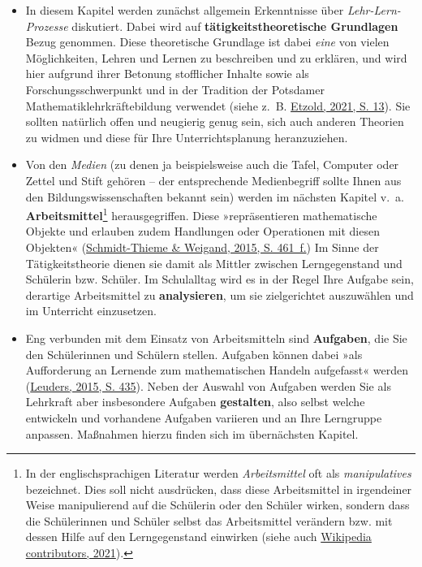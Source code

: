 \documentclass[
]{scrbook}
\theoremstyle{definition}
\theoremstyle{definition}
\theoremstyle{definition}
\theoremstyle{definition}
\theoremstyle{remark}
\begin{document}
\begin{itemize}
\item
  In diesem Kapitel werden zunächst allgemein Erkenntnisse über \emph{Lehr-Lern-Prozesse} diskutiert. Dabei wird auf \textbf{tätigkeitstheoretische Grundlagen} Bezug genommen. Diese theoretische Grundlage ist dabei \emph{eine} von vielen Möglichkeiten, Lehren und Lernen zu beschreiben und zu erklären, und wird hier aufgrund ihrer Betonung stofflicher Inhalte sowie als Forschungsschwerpunkt und in der Tradition der Potsdamer Mathematiklehrkräftebildung verwendet (siehe z.~B. \protect\hyperlink{ref-Etzold2021}{Etzold, 2021, S. 13}). Sie sollten natürlich offen und neugierig genug sein, sich auch anderen Theorien zu widmen und diese für Ihre Unterrichtsplanung heranzuziehen.
\item
  Von den \emph{Medien} (zu denen ja beispielsweise auch die Tafel, Computer oder Zettel und Stift gehören -- der entsprechende Medienbegriff sollte Ihnen aus den Bildungswissenschaften bekannt sein) werden im nächsten Kapitel v.~a. \textbf{Arbeitsmittel}\footnote{In der englischsprachigen Literatur werden \emph{Arbeitsmittel} oft als \emph{manipulatives} bezeichnet. Dies soll nicht ausdrücken, dass diese Arbeitsmittel in irgendeiner Weise manipulierend auf die Schülerin oder den Schüler wirken, sondern dass die Schülerinnen und Schüler selbst das Arbeitsmittel verändern bzw. mit dessen Hilfe auf den Lerngegenstand einwirken (siehe auch \protect\hyperlink{ref-enwiki:1023437370}{Wikipedia contributors, 2021}).} herausgegriffen. Diese »repräsentieren mathematische Objekte und erlauben zudem Handlungen oder Operationen mit diesen Objekten« (\protect\hyperlink{ref-Schmidt-Thieme2015}{Schmidt-Thieme \& Weigand, 2015, S. 461~f.}) Im Sinne der Tätigkeitstheorie dienen sie damit als Mittler zwischen Lerngegenstand und Schülerin bzw. Schüler. Im Schulalltag wird es in der Regel Ihre Aufgabe sein, derartige Arbeitsmittel zu \textbf{analysieren}, um sie zielgerichtet auszuwählen und im Unterricht einzusetzen.
\item
  Eng verbunden mit dem Einsatz von Arbeitsmitteln sind \textbf{Aufgaben}, die Sie den Schülerinnen und Schülern stellen. Aufgaben können dabei »als Aufforderung an Lernende zum mathematischen Handeln aufgefasst« werden (\protect\hyperlink{ref-Leuders2015}{Leuders, 2015, S. 435}). Neben der Auswahl von Aufgaben werden Sie als Lehrkraft aber insbesondere Aufgaben \textbf{gestalten}, also selbst welche entwickeln und vorhandene Aufgaben variieren und an Ihre Lerngruppe anpassen. Maßnahmen hierzu finden sich im übernächsten Kapitel.
\end{itemize}
\end{document}
